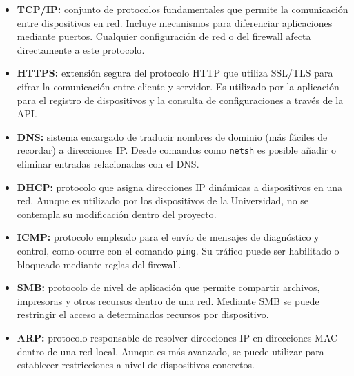 \begin{itemize}
	\item \textbf{TCP/IP:} conjunto de protocolos fundamentales que permite la comunicación entre dispositivos en red.
	Incluye mecanismos para diferenciar aplicaciones mediante puertos.
	Cualquier configuración de red o del firewall afecta directamente a este protocolo\cite{wikipediaTCP}.

	\item \textbf{HTTPS:} extensión segura del protocolo HTTP que utiliza SSL/TLS para cifrar la comunicación entre
	cliente y servidor.
	Es utilizado por la aplicación para el registro de dispositivos y la consulta de configuraciones a través de la API\cite{wikipediaHTTPS}.

	\item \textbf{DNS:} sistema encargado de traducir nombres de dominio (más fáciles de recordar) a direcciones IP.
	Desde comandos como \texttt{netsh} es posible añadir o eliminar entradas relacionadas con el DNS\cite{wikipediaDNS}.

	\item \textbf{DHCP:} protocolo que asigna direcciones IP dinámicas a dispositivos en una red.
	Aunque es utilizado por los dispositivos de la Universidad, no se contempla su modificación dentro del proyecto\cite{microsoftDHCP}.

	\item \textbf{ICMP:} protocolo empleado para el envío de mensajes de diagnóstico y control, como ocurre con el
	comando \texttt{ping}.
	Su tráfico puede ser habilitado o bloqueado mediante reglas del firewall\cite{wikipediaICMP}.

	\item \textbf{SMB:} protocolo de nivel de aplicación que permite compartir archivos, impresoras y otros recursos
	dentro de una red.
	Mediante SMB se puede restringir el acceso a determinados recursos por dispositivo\cite{techtargetSMB}.

	\item \textbf{ARP:} protocolo responsable de resolver direcciones IP en direcciones MAC dentro de una red local.
	Aunque es más avanzado, se puede utilizar para establecer restricciones a nivel de dispositivos concretos\cite{wikipediaARP}.
\end{itemize}